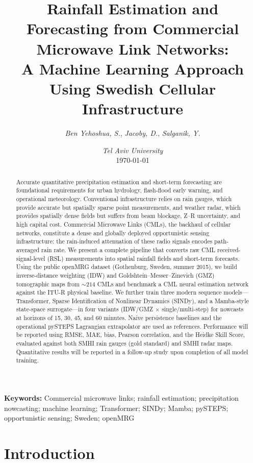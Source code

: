 \documentclass[12pt, a4paper]{article}
\title{Rainfall Estimation and Forecasting from Commercial Microwave Link Networks:\\
A Machine Learning Approach Using Swedish Cellular Infrastructure}
\author{\textit{Ben Yehoshua, S.}, \textit{Jacoby, D.}, \textit{Salganik, Y.}}
\date{\textit{Tel Aviv University} \\ \today}
\providecommand{\keywords}[1]{\vspace{0.5em}\noindent\textbf{Keywords:} #1}
\begin{document}
\maketitle

\begin{abstract}
Accurate quantitative precipitation estimation and short-term forecasting
are foundational requirements for urban hydrology, flash-flood early
warning, and operational meteorology. Conventional infrastructure relies
on rain gauges, which provide accurate but spatially sparse point
measurements, and weather radar, which provides spatially dense fields but
suffers from beam blockage, Z--R uncertainty, and high capital cost.
Commercial Microwave Links (CMLs), the backhaul of cellular networks,
constitute a dense and globally deployed opportunistic sensing
infrastructure: the rain-induced attenuation of these radio signals
encodes path-averaged rain rate. We present a complete pipeline that
converts raw CML received-signal-level (RSL) measurements into spatial
rainfall fields and short-term forecasts. Using the public openMRG
dataset (Gothenburg, Sweden, summer 2015), we build inverse-distance
weighting (IDW) and Goldshtein--Messer--Zinevich (GMZ) tomographic maps
from \(\sim\!214\) CMLs and benchmark a CML neural estimation network
against the ITU-R physical baseline. We further train three modern
sequence models---Transformer, Sparse Identification of Nonlinear
Dynamics (SINDy), and a Mamba-style state-space surrogate---in four
variants (IDW/GMZ \(\times\) single/multi-step) for nowcasts at horizons
of 15, 30, 45, and 60 minutes. Naive persistence baselines and the
operational pySTEPS Lagrangian extrapolator are used as references.
Performance will be reported using RMSE, MAE, bias, Pearson correlation,
and the Heidke Skill Score, evaluated against both SMHI rain gauges
(gold standard) and SMHI radar maps. Quantitative results will be
reported in a follow-up study upon completion of all model training.
\end{abstract}

\keywords{Commercial microwave links; rainfall estimation; precipitation nowcasting;
machine learning; Transformer; SINDy; Mamba; pySTEPS; opportunistic sensing;
Sweden; openMRG}

\section{Introduction}\label{sec:intro}
\end{document}
